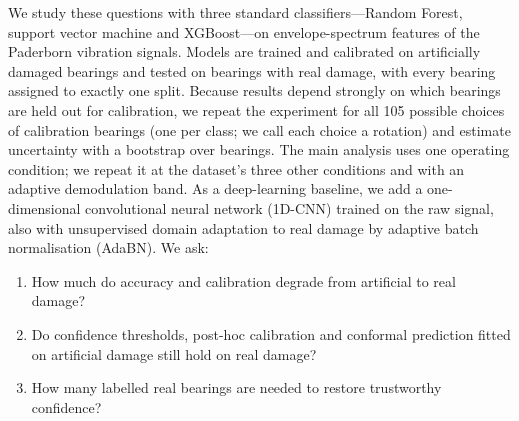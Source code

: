 We study these questions with three standard classifiers---Random Forest, support vector machine and XGBoost---on
envelope-spectrum features of the Paderborn vibration signals. Models are trained and calibrated on artificially
damaged bearings and tested on bearings with real damage, with every bearing assigned to exactly one split. Because
results depend strongly on which bearings are held out for calibration, we repeat the experiment for all 105
possible choices of calibration bearings (one per class; we call each choice a rotation) and estimate uncertainty with
a bootstrap over bearings. The main analysis uses one operating condition; we repeat it at the dataset's three other
conditions and with an adaptive demodulation band. As a deep-learning baseline, we add a one-dimensional
convolutional neural network (1D-CNN) trained on the raw signal, also with unsupervised domain adaptation to real
damage by adaptive batch normalisation (AdaBN). We ask:
\begin{enumerate}[nosep,label=\textbf{RQ\arabic*}]
  \item How much do accuracy and calibration degrade from artificial to real damage?
  \item Do confidence thresholds, post-hoc calibration and conformal prediction fitted on artificial damage still
        hold on real damage?
  \item How many labelled real bearings are needed to restore trustworthy confidence?
\end{enumerate}

